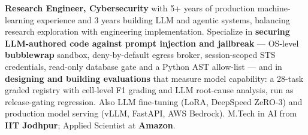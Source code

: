 \documentclass[letter,10pt]{article}
\begin{document}

\textbf{Research Engineer, Cybersecurity} with 5+ years of production machine-learning experience and 3 years building LLM and agentic systems, balancing research exploration with engineering implementation.
Specialize in \textbf{securing LLM-authored code against prompt injection and jailbreak} — OS-level \textbf{bubblewrap} sandbox, deny-by-default egress broker, session-scoped STS credentials, read-only database gate and a Python AST allow-list — and in \textbf{designing and building evaluations} that measure model capability: a 28-task graded registry with cell-level F1 grading and LLM root-cause analysis, run as release-gating regression.
Also LLM fine-tuning (LoRA, DeepSpeed ZeRO-3) and production model serving (vLLM, FastAPI, AWS Bedrock).
M.Tech in AI from \textbf{IIT Jodhpur}; Applied Scientist at \textbf{Amazon}.
\end{document}
